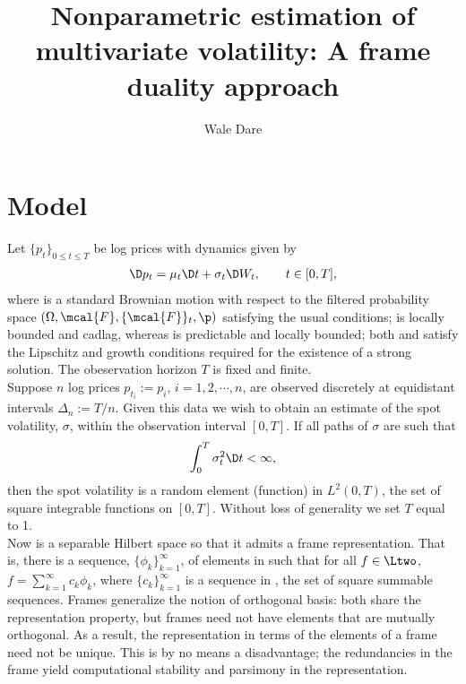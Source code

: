 
\usepackage[toc,page]{appendix}
\newcommand{\sumn}{\ensuremath{\sum_{k \in \nats}}\xspace}
\newcommand{\sumi}{\ensuremath{\sum_{k \in \ints}}\xspace}
\newcommand{\sv}{\ensuremath{\sigma_t^2}\xspace}
\newcommand{\svnt}{\ensuremath{\sigma^2}\xspace}
\newcommand{\svhk}{\ensuremath{\sigma^2_{h,k}}\xspace}
\newcommand{\vh}{\ensuremath{V_h(\phi)}\xspace}
\newcommand{\svn}{\ensuremath{\hat{\sigma}_{n}^2}\xspace}
\newcommand{\svnN}{\ensuremath{\hat{\sigma}_{t}^2}\xspace}
\newcommand{\hs}{\ensuremath{\mcal{H}}\xspace}
\newcommand{\chk}{\ensuremath{{c}_{h,k}}\xspace}
\newcommand{\cnhk}{\ensuremath{\hat{c}_{h,k}}\xspace}
\title{Nonparametric estimation of multivariate volatility: A frame duality approach}
\author{Wale Dare}

\maketitle
\section{Model}
Let $\{p_t\}_{0 \le t\le T}$ be  log prices with dynamics given by  
\begin{align}
  \D p_t =   \mu_t \D t + \sigma_t \D W_t, \qquad t \in [0,T],
  \label{}
\end{align}
where \sbm is a standard Brownian motion with respect to the filtered probability space $(\Omega, \mcal{F}, \{\mcal{F}\}_t, \p)$ satisfying the usual conditions; \idp is locally bounded and cadlag, %
 whereas  \ivp is  predictable and locally bounded; %
  both \idp and \ivp satisfy the Lipschitz and growth conditions required for the existence of a strong solution. The obeservation horizon $T$ is fixed and finite.   \\ 
  \indent Suppose $n$ log prices $ p_{t_i} := p_i$, $i=1,2,\cdots,n$, are observed discretely at equidistant intervals $\Delta_n := T/n$. Given this data we wish to obtain an estimate of the  spot volatility, $\sigma$, within the observation interval $[0,T]$. If all paths of $\sigma$ are such that 
\begin{align} 
  \int_0^T\sigma_t^2 \D t < \infty, \notag  
\end{align}
  then  the spot volatility is a random element (function) in $L^2(0,T)$, the set of square integrable functions on $[0,T]$. Without loss of generality we set $T$ equal to 1. \\
  \indent Now \Ltwo is a separable Hilbert space so that it  admits a frame representation.  That is, there is a sequence, $\{\phi_k\}_{k=1}^{\infty}$, of elements in \Ltwo such that for all $f \in \Ltwo$,  $f = \sum_{k = 1}^{\infty} c_k \phi_k$, where $\{c_k\}^\infty_{k =1} $ is a sequence in \ltwo, the set of square summable sequences. Frames generalize the notion of orthogonal basis: both share the representation property, but frames need not have elements  that are mutually orthogonal. As a result, the representation in terms of the elements of a frame need not be unique.  
This is by no means a disadvantage; the redundancies in the frame yield computational stability and parsimony in the representation.
